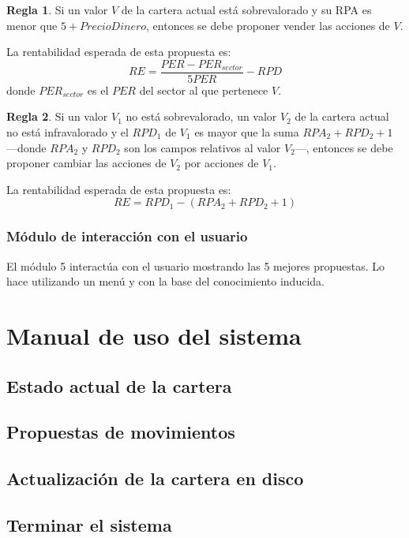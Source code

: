 \documentclass[a4paper, 11pt, titlepage]{article}
\theoremstyle{definition}
\newtheorem{regla}{Regla}
\begin{document}
    \begin{regla}
        Si un valor $V$ de la cartera actual está sobrevalorado y su RPA es menor que $5 + PrecioDinero$, entonces se debe proponer vender las acciones de $V$.

        La rentabilidad esperada de esta propuesta es:
        \[
        RE = \frac{PER - PER_{sector}}{5 PER} - RPD
        \]
        donde $PER_{sector}$ es el $PER$ del sector al que pertenece $V$.
    \end{regla}

    \begin{regla}
        Si un valor $V_1$ no está sobrevalorado, un valor $V_2$ de la cartera actual no está infravalorado y el $RPD_1$ de $V_1$ es mayor que la suma $RPA_2 + RPD_2 + 1$ ---donde $RPA_2$ y $RPD_2$ son los campos relativos al valor $V_2$---, entonces se debe proponer cambiar las acciones de $V_2$ por acciones de $V_1$.

        La rentabilidad esperada de esta propuesta es:
        \[
        RE = RPD_1 - (RPA_2 + RPD_2 + 1)
        \]
    \end{regla}

  \subsubsection{Módulo de interacción con el usuario}

  El módulo 5 interactúa con el usuario mostrando las 5 mejores propuestas.
  Lo hace utilizando un menú y con la base del conocimiento inducida. 


  \section{Manual de uso del sistema}
  \subsection{Estado actual de la cartera}
  \subsection{Propuestas de movimientos}
  \subsection{Actualización de la cartera en disco}
  \subsection{Terminar el sistema}
\end{document}

